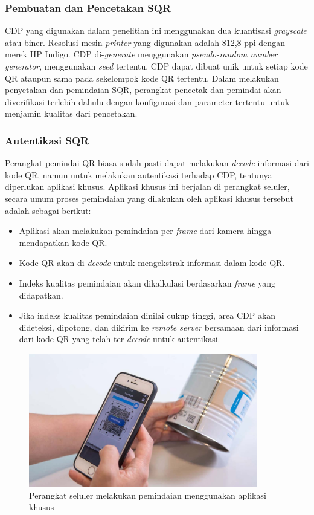 \subsubsection{Pembuatan dan Pencetakan SQR}
CDP yang digunakan dalam penelitian ini menggunakan dua kuantisasi \emph{grayscale} atau biner. Resolusi mesin \emph{printer} yang digunakan adalah 812,8 ppi dengan merek HP Indigo. CDP di-\emph{generate} menggunakan \emph{pseudo-random number generator}, menggunakan \emph{seed} tertentu. CDP dapat dibuat unik untuk setiap kode QR ataupun sama pada sekelompok kode QR tertentu. Dalam melakukan penyetakan dan pemindaian SQR, perangkat pencetak dan pemindai akan diverifikasi terlebih dahulu dengan konfigurasi dan parameter tertentu untuk menjamin kualitas dari pencetakan.

\subsubsection{Autentikasi SQR}
Perangkat pemindai QR biasa sudah pasti dapat melakukan \emph{decode} informasi dari kode QR, namun untuk melakukan autentikasi terhadap CDP, tentunya diperlukan aplikasi khusus. Aplikasi khusus ini berjalan di perangkat seluler, secara umum proses pemindaian yang dilakukan oleh aplikasi khusus tersebut adalah sebagai berikut:

\begin{itemize}
	\item Aplikasi akan melakukan pemindaian per-\emph{frame} dari kamera hingga mendapatkan kode QR.
	\item Kode QR akan di-\emph{decode} untuk mengekstrak informasi dalam kode QR.
	\item Indeks kualitas pemindaian akan dikalkulasi berdasarkan \emph{frame} yang didapatkan.
	\item Jika indeks kualitas pemindaian dinilai cukup tinggi, area CDP akan dideteksi, dipotong, dan dikirim ke \emph{remote server} bersamaan dari informasi dari kode QR yang telah ter-\emph{decode} untuk autentikasi.
\end{itemize}

\begin{figure}[h]
	\centering
	\includegraphics[width=10cm]{contents/chapter-2/2-pemindaiansqr.jpg}
	\caption{Perangkat seluler melakukan pemindaian menggunakan aplikasi khusus \cite{picard2021counterfeit}}
	\label{Fig: 2-pemindaisqr}
\end{figure}

